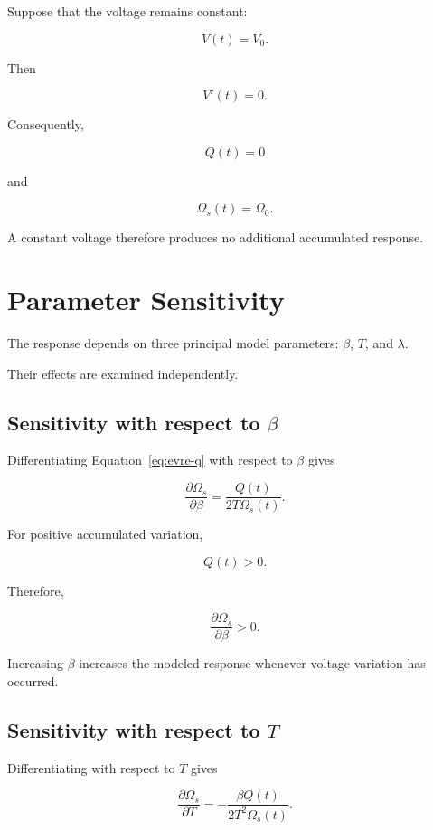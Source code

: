 \documentclass[12pt]{article}
\theoremstyle{definition}
\theoremstyle{remark}
\begin{document}
Suppose that the voltage remains constant:

\[
V(t)=V_0.
\]

Then

\[
V'(t)=0.
\]

Consequently,

\[
Q(t)=0
\]

and

\begin{equation}
\Omega_s(t)=\Omega_0.
\end{equation}

A constant voltage therefore produces
no additional accumulated response.

\section{Parameter Sensitivity}

The response depends on three principal
model parameters: \(\beta\), \(T\), and
\(\lambda\).

Their effects are examined independently.

\subsection{Sensitivity with respect to \(\beta\)}

Differentiating Equation~\eqref{eq:evre-q}
with respect to \(\beta\) gives

\begin{equation}
\frac{\partial\Omega_s}{\partial\beta}
=
\frac{Q(t)}
{2T\Omega_s(t)}.
\label{eq:beta-sensitivity}
\end{equation}

For positive accumulated variation,

\[
Q(t)>0.
\]

Therefore,

\[
\frac{\partial\Omega_s}{\partial\beta}>0.
\]

Increasing \(\beta\) increases the modeled
response whenever voltage variation has occurred.

\subsection{Sensitivity with respect to \(T\)}

Differentiating with respect to \(T\) gives

\begin{equation}
\frac{\partial\Omega_s}{\partial T}
=
-\frac{\beta Q(t)}
{2T^2\Omega_s(t)}.
\label{eq:T-sensitivity}
\end{equation}
\end{document}
